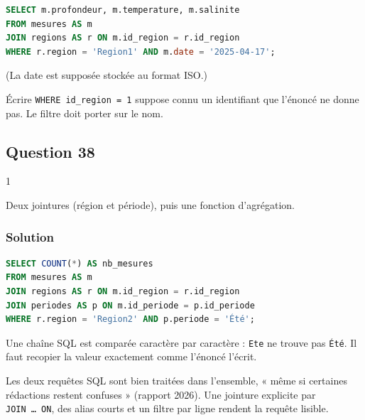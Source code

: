 \documentclass[11pt,a4paper]{article}
\begin{document}
\begin{lstlisting}[language=SQL]
SELECT m.profondeur, m.temperature, m.salinite
FROM mesures AS m
JOIN regions AS r ON m.id_region = r.id_region
WHERE r.region = 'Region1' AND m.date = '2025-04-17';
\end{lstlisting}

(La date est supposée stockée au format ISO.)

\begin{piege}

Écrire \texttt{WHERE\ id\_region\ =\allowbreak{}\ 1} suppose connu un identifiant que l'énoncé ne donne pas. Le filtre doit porter sur le nom.

\end{piege}

\hypertarget{question-38}{%
\subsection{Question 38}\label{question-38}}

\begin{indication}{1}

Deux jointures (région et période), puis une fonction d'agrégation.

\end{indication}

\hypertarget{solution-37}{%
\subsubsection{Solution}\label{solution-37}}

\begin{lstlisting}[language=SQL]
SELECT COUNT(*) AS nb_mesures
FROM mesures AS m
JOIN regions AS r ON m.id_region = r.id_region
JOIN periodes AS p ON m.id_periode = p.id_periode
WHERE r.region = 'Region2' AND p.periode = 'Été';
\end{lstlisting}

\begin{piege}

Une chaîne SQL est comparée caractère par caractère : \texttt{\textquotesingle{}Ete\textquotesingle{}} ne trouve pas \texttt{\textquotesingle{}Été\textquotesingle{}}. Il faut recopier la valeur exactement comme l'énoncé l'écrit.

\end{piege}

\begin{jury}

Les deux requêtes SQL sont bien traitées dans l'ensemble, « même si certaines rédactions restent confuses » (rapport 2026). Une jointure explicite par \texttt{JOIN\ …\ ON}, des alias courts et un filtre par ligne rendent la requête lisible.

\end{jury}
\end{document}
